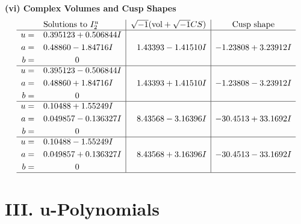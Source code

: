 \documentclass[1p]{elsarticle_modified}
\theoremstyle{definition}
\newcommand{\I}{\sqrt{-1}}
\begin{document}
\newpage\flushleft \textbf{(vi) Complex Volumes and Cusp Shapes}
$$\begin{array}{c|c|c}  
\text{Solutions to }I^u_{2}& \I (\text{vol} + \sqrt{-1}CS) & \text{Cusp shape}\\
 \hline 
\begin{aligned}
u &= \phantom{-}0.395123 + 0.506844 I \\
a &= \phantom{-}0.48860 - 1.84716 I \\
b &= \phantom{-0.000000 } 0\end{aligned}
 & \phantom{-}1.43393 - 1.41510 I & -1.23808 + 3.23912 I \\ \hline\begin{aligned}
u &= \phantom{-}0.395123 - 0.506844 I \\
a &= \phantom{-}0.48860 + 1.84716 I \\
b &= \phantom{-0.000000 } 0\end{aligned}
 & \phantom{-}1.43393 + 1.41510 I & -1.23808 - 3.23912 I \\ \hline\begin{aligned}
u &= \phantom{-}0.10488 + 1.55249 I \\
a &= \phantom{-}0.049857 - 0.136327 I \\
b &= \phantom{-0.000000 } 0\end{aligned}
 & \phantom{-}8.43568 - 3.16396 I & -30.4513 + 33.1692 I \\ \hline\begin{aligned}
u &= \phantom{-}0.10488 - 1.55249 I \\
a &= \phantom{-}0.049857 + 0.136327 I \\
b &= \phantom{-0.000000 } 0\end{aligned}
 & \phantom{-}8.43568 + 3.16396 I & -30.4513 - 33.1692 I\\
 \hline 
 \end{array}$$\newpage
\newpage\renewcommand{\arraystretch}{1}
\centering \section*{ III. u-Polynomials}
\end{document}
